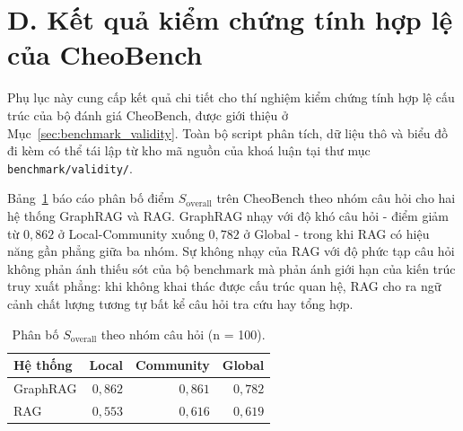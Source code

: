 
\section*{D. Kết quả kiểm chứng tính hợp lệ của CheoBench}
\label{appendix:benchmark_validity}

Phụ lục này cung cấp kết quả chi tiết cho thí nghiệm kiểm chứng tính hợp lệ cấu trúc của bộ đánh giá CheoBench, được giới thiệu ở Mục~\ref{sec:benchmark_validity}. Toàn bộ script phân tích, dữ liệu thô và biểu đồ đi kèm có thể tái lập từ kho mã nguồn của khoá luận tại thư mục \texttt{benchmark/validity/}.

Bảng~\ref{tab:appendix_score_by_cat} báo cáo phân bố điểm $S_{\text{overall}}$ trên CheoBench theo nhóm câu hỏi cho hai hệ thống GraphRAG và RAG. GraphRAG nhạy với độ khó câu hỏi - điểm giảm từ $0,862$ ở Local-Community xuống $0,782$ ở Global - trong khi RAG có hiệu năng gần phẳng giữa ba nhóm. Sự không nhạy của RAG với độ phức tạp câu hỏi không phản ánh thiếu sót của bộ benchmark mà phản ánh giới hạn của kiến trúc truy xuất phẳng: khi không khai thác được cấu trúc quan hệ, RAG cho ra ngữ cảnh chất lượng tương tự bất kể câu hỏi tra cứu hay tổng hợp.

\begin{table}[h]
\centering
\caption{Phân bố $S_{\text{overall}}$ theo nhóm câu hỏi (n = 100).}
\label{tab:appendix_score_by_cat}
\renewcommand{\arraystretch}{1.2}
\begin{tabular}{lrrr}
\hline
\textbf{Hệ thống} & \textbf{Local} & \textbf{Community} & \textbf{Global} \\
\hline
GraphRAG & $0,862$ & $0,861$ & $0,782$ \\
RAG      & $0,553$ & $0,616$ & $0,619$ \\
\hline
\end{tabular}
\end{table}
